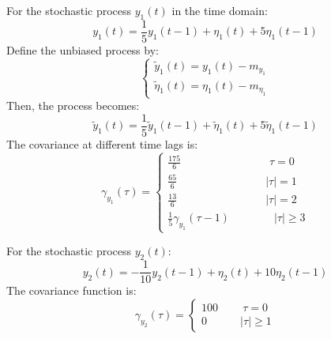For the stochastic process $y_1(t)$ in the time domain:
\[y_1(t)=\dfrac{1}{5}y_1(t-1)+\eta_1(t)+5\eta_1(t-1)\]
Define the unbiased process by:
\[\begin{cases}
    \tilde{y}_1(t)=y_1(t)-m_{y_1}\\
    \tilde{\eta}_1(t)=\eta_1(t)-m_{\eta_1}
\end{cases}\]
Then, the process becomes:
\[\tilde{y}_1(t)=\dfrac{1}{5}\tilde{y}_1(t-1)+\tilde{\eta}_1(t)+5\tilde{\eta}_1(t-1)\]
The covariance at different time lags is:
\[\gamma_{y_1}(\tau)=\begin{cases}
    \frac{175}{6} \qquad\qquad\qquad\qquad \tau=0 \\
    \frac{65}{6} \qquad\qquad\qquad\qquad \left\lvert \tau\right\rvert =1 \\
    \frac{13}{6} \qquad\qquad\qquad\qquad \left\lvert \tau\right\rvert =2 \\
    \frac{1}{5}\gamma_{y_1}(\tau-1) \qquad\qquad \left\lvert \tau\right\rvert \geq 3 
\end{cases}\]

For the stochastic process $y_2(t)$:
\[y_2(t)=-\dfrac{1}{10}y_2(t-1)+\eta_2(t)+10\eta_2(t-1)\]
The covariance function is:
\[\gamma_{y_2}(\tau)=\begin{cases}
    100 \qquad\: \tau=0 \\
    0 \qquad\quad  \left\lvert \tau\right\rvert \geq 1
\end{cases}\]